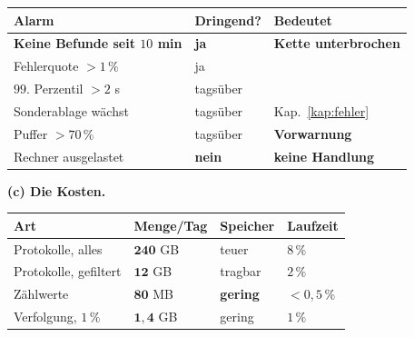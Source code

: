 \begin{aufgabe}
\begin{center}
{\small
\renewcommand{\arraystretch}{1.45}
\begin{tabular}{@{}P{3.0cm}P{2.0cm}P{2.6cm}@{}}
\toprule
\textbf{Alarm} & \textbf{Dringend?} & \textbf{Bedeutet}\\
\midrule
\textbf{Keine Befunde seit $10$ min} & \textcolor{akzent}{\textbf{ja}} & \textbf{Kette unterbrochen}\\
Fehlerquote $>1\,\%$ & \textcolor{akzent}{ja} & \\
$99.$ Perzentil $>2$ s & \textcolor{mittel}{tagsüber} & \\
Sonderablage wächst & \textcolor{mittel}{tagsüber} & \textcolor{gruen}{Kap.~\ref{kap:fehler}}\\
Puffer $>70\,\%$ & \textcolor{mittel}{tagsüber} & \textcolor{gruen}{\textbf{Vorwarnung}}\\
Rechner ausgelastet & \textcolor{akzent}{\textbf{nein}} & \textcolor{akzent}{\textbf{keine Handlung}}\\
\bottomrule
\end{tabular}}
\end{center}

\begin{center}
\begin{minipage}{0.88\textwidth}
\end{minipage}
\end{center}

\begin{center}
\end{center}

\medskip
\textbf{(c) Die Kosten.}

\begin{center}
{\small
\renewcommand{\arraystretch}{1.45}
\begin{tabular}{@{}P{2.4cm}P{2.2cm}P{2.0cm}P{2.0cm}@{}}
\toprule
\textbf{Art} & \textbf{Menge/Tag} & \textbf{Speicher} & \textbf{Laufzeit}\\
\midrule
Protokolle, alles & \textcolor{akzent}{$\mathbf{240}$ GB} & \textcolor{akzent}{teuer} & \textcolor{akzent}{$8\,\%$}\\
Protokolle, gefiltert & $\mathbf{12}$ GB & \textcolor{gruen}{tragbar} & $2\,\%$\\
Zählwerte & \textcolor{gruen}{$\mathbf{80}$ MB} & \textcolor{gruen}{\textbf{gering}} & \textcolor{gruen}{$<0{,}5\,\%$}\\
Verfolgung, $1\,\%$ & $\mathbf{1{,}4}$ GB & \textcolor{gruen}{gering} & $1\,\%$\\
\bottomrule
\end{tabular}}
\end{center}


\end{aufgabe}
